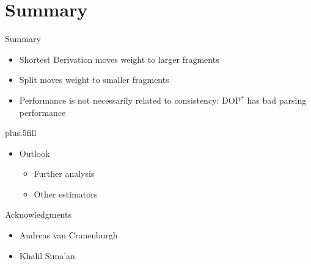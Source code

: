 \documentclass{beamer}
\newcommand{\dops}[0]{DOP$ ^*$}
\begin{document}
\section*{Summary}

\begin{frame}{Summary}

  \begin{itemize}
  \item
    \alert{Shortest Derivation} moves weight to larger fragments
  \item
    \alert{Split} moves weight to smaller fragments

  \item
    \alert{Performance} is not necessarily related to \alert{consistency}:   \alert{\dops{}} has bad parsing performance

  \end{itemize}
  
  \vskip0pt plus.5fill
  \begin{itemize}
  \item
    Outlook


    \begin{itemize}
    \item Further analysis %
\item Other estimators 


    \end{itemize}
  \end{itemize}
\end{frame}

\begin{frame}{Acknowledgments}
\begin{itemize}
\item Andreas van Cranenburgh
\item Khalil Sima'an
\end{itemize}
\end{frame}
\end{document}
